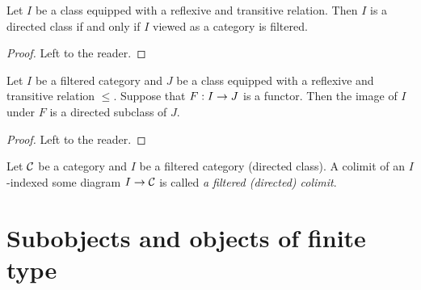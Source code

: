 \begin{fact}\label{fact:filteredisgeneralizationofdirected}
Let $I$ be a class equipped with a reflexive and transitive relation. Then $I$ is a directed class if and only if $I$ viewed as a category is filtered.
\end{fact}
\begin{proof}
Left to the reader.
\end{proof}

\begin{fact}\label{fact:imageoffilteredinclass}
Let $I$ be a filtered category and $J$ be a class equipped with a reflexive and transitive relation $\leq$. Suppose that $F:I\rightarrow J$ is a functor. Then the image of $I$ under $F$ is a directed subclass of $J$.
\end{fact}
\begin{proof}
Left to the reader.
\end{proof}

\begin{definition}
Let ${\mathcal C}$ be a category and $I$ be a filtered category (directed class). A colimit of an $I$-indexed some diagram $I\rightarrow {\mathcal C}$ is called \textit{a filtered (directed) colimit}.
\end{definition}



\section{Subobjects and objects of finite type}

